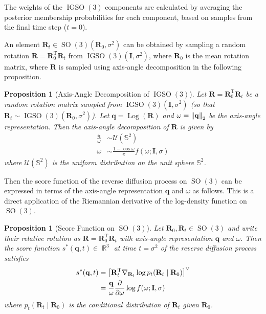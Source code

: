 \documentclass{article}
\theoremstyle{plain}
\newtheorem{proposition}[theorem]{Proposition}
\theoremstyle{definition}
\theoremstyle{remark}
\DeclareMathOperator{\SO}{SO}
\DeclareMathOperator{\IGSO}{IGSO}
\DeclareMathOperator{\Log}{\operatorname{Log}}
\DeclareMathOperator{\R}{\mathbb{R}}
\begin{document}
The weights of the $\IGSO(3)$ components are calculated by averaging the posterior membership probabilities for each component, based on samples from the final time step ($t=0$).

An element $\mathbf{R}_t\in\SO(3)(\mathbf{R}_0, \sigma^2)$ can be obtained by sampling a random rotation $\mathbf{R} = \mathbf{R}_0^\mathrm{T}\mathbf{R}_t$ from $\IGSO(3)(\mathbf{I}, \sigma^2)$, where $\mathbf{R}_0$ is the mean rotation matrix, where $\mathbf{R}$ is sampled using axis-angle decomposition in the following proposition.

\begin{proposition}[Axis-Angle Decomposition of $\IGSO(3)$]\label{prop:axis_angle_decomposition}
    Let $\mathbf{R} = \mathbf{R}_0^\mathrm{T}\mathbf{R}_t$ be a random rotation matrix sampled from $\IGSO(3)(\mathbf{I}, \sigma^2)$ (so that $\mathbf{R}_{t} \sim \IGSO(3)(\mathbf{R}_0, \sigma^2)$). Let $\mathbf{q} = \Log(\mathbf{R})$ and $\omega = \norm{\mathbf{q}}_2$ be the axis-angle representation. Then the axis-angle decomposition of $\mathbf{R}$ is given by
    \begin{align}
        \frac{\mathbf{q}}{\omega} & \sim \mathcal{U}(\mathbb{S}^2)                             \\
        \omega                    & \sim \frac{1-\cos\omega}{\pi}f(\omega; \mathbf{I}, \sigma)
    \end{align}
    where $\mathcal{U}(\mathbb{S}^2)$ is the uniform distribution on the unit sphere $\mathbb{S}^2$.
\end{proposition}

Then the score function of the reverse diffusion process on $\SO(3)$ can be expressed in terms of the axis-angle representation $\mathbf{q}$ and $\omega$ as follows. This is a direct application of the Riemannian derivative of the log-density function on $\SO(3)$.

\begin{proposition}[Score Function on $\SO(3)$]\label{prop:stein_score}
    Let $\mathbf{R}_0, \mathbf{R}_t\in\SO(3)$ and write their relative rotation as $\mathbf{R} = \mathbf{R}_0^\mathrm{T}\mathbf{R}_t$ with axis-angle representation $\mathbf{q}$ and $\omega$. Then the score function $s^*(\mathbf{q}, t) \in \R^3$ at time $t = \sigma^2$ of the reverse diffusion process satisfies~\cite{se3_diffusion}
    \begin{equation}
        \begin{aligned}
            s^*(\mathbf{q}, t) & = \qty[\mathbf{R}_t^\mathrm{T} \nabla_{\mathbf{R}_t} \log p_t(\mathbf{R}_t\mid \mathbf{R}_0)]^\vee \\
                               & = \frac{\mathbf{q}}{\omega} \pdv{\omega} \log f(\omega; \mathbf{I}, \sigma)
        \end{aligned}
    \end{equation}
    where $p_t(\mathbf{R}_t\mid \mathbf{R}_0)$ is the conditional distribution of $\mathbf{R}_t$ given $\mathbf{R}_0$.
\end{proposition}
\end{document}
